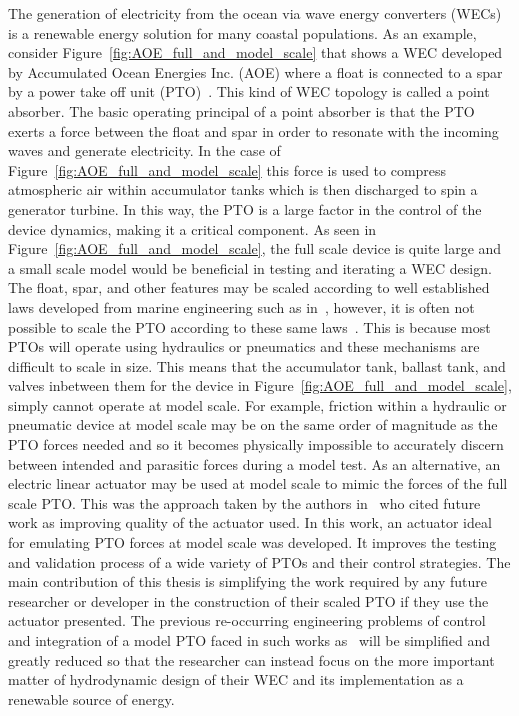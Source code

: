 \documentclass{article}
\begin{document}
The generation of electricity from the ocean via wave energy converters (WECs) is a renewable energy solution for many coastal populations. As an example, consider Figure~\ref{fig:AOE_full_and_model_scale} that shows a WEC developed by Accumulated Ocean Energies Inc. (AOE) where a float is connected to a spar by a power take off unit (PTO)~\cite{ThacherMA2015}. This kind of WEC topology is called a point absorber. The basic operating principal of a point absorber is that the PTO exerts a force between the float and spar in order to resonate with the incoming waves and generate electricity. In the case of Figure~\ref{fig:AOE_full_and_model_scale} this force is used to compress atmospheric air within accumulator tanks which is then discharged to spin a generator turbine. In this way, the PTO is a large factor in the control of the device dynamics, making it a critical component. As seen in Figure~\ref{fig:AOE_full_and_model_scale}, the full scale device is quite large and a small scale model would be beneficial in testing and iterating a WEC design. The float, spar, and other features may be scaled according to well established laws developed from marine engineering such as in~\cite[pg.11]{HydrodynamicsScalingSteen2014}, however, it is often not possible to scale the PTO according to these same laws~\cite{HughesScaling1993,BeattyScaling2010}. This is because most PTOs will operate using hydraulics or pneumatics and these mechanisms are difficult to scale in size. This means that the accumulator tank, ballast tank, and valves inbetween them for the device in Figure~\ref{fig:AOE_full_and_model_scale}, simply cannot operate at model scale. For example, friction within a hydraulic or pneumatic device at model scale may be on the same order of magnitude as the PTO forces needed and so it becomes physically impossible to accurately discern between intended and parasitic forces during a model test. As an alternative, an electric linear actuator may be used at model scale to mimic the forces of the full scale PTO. This was the approach taken by the authors in~\cite{Beatty2015} who cited future work as improving quality of the actuator used. In this work, an actuator ideal for emulating PTO forces at model scale was developed. It improves the testing and validation process of a wide variety of PTOs and their control strategies. The main contribution of this thesis is simplifying the work required by any future researcher or developer in the construction of their scaled PTO if they use the actuator presented. The previous re-occurring engineering problems of control and integration of a model PTO faced in such works as~\cite{Beattyenrg2017,Beatty2015,Bryce_Mitacs_Report_2017,Bailey2009} will be simplified and greatly reduced so that the researcher can instead focus on the more important matter of hydrodynamic design of their WEC and its implementation as a renewable source of energy.
\end{document}
